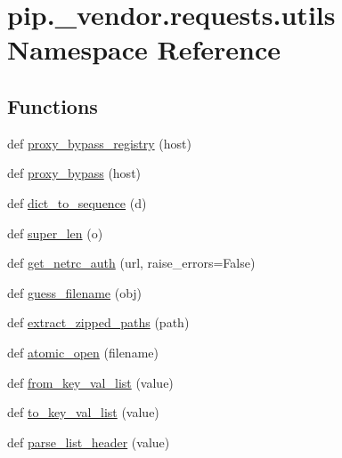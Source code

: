 \hypertarget{namespacepip_1_1__vendor_1_1requests_1_1utils}{}\section{pip.\+\_\+vendor.\+requests.\+utils Namespace Reference}
\label{namespacepip_1_1__vendor_1_1requests_1_1utils}
\subsection*{Functions}
\begin{DoxyCompactItemize}
\item 
def \hyperlink{namespacepip_1_1__vendor_1_1requests_1_1utils_ae01a288e9e64d3a6341b9b07cc06d3ee}{proxy\+\_\+bypass\+\_\+registry} (host)
\item 
def \hyperlink{namespacepip_1_1__vendor_1_1requests_1_1utils_ae931cb674d7a3a3929f41f054ab25c8a}{proxy\+\_\+bypass} (host)
\item 
def \hyperlink{namespacepip_1_1__vendor_1_1requests_1_1utils_a2d8f91bc902147ff375a5e6be69a1d2b}{dict\+\_\+to\+\_\+sequence} (d)
\item 
def \hyperlink{namespacepip_1_1__vendor_1_1requests_1_1utils_a728d14d509de2836fe639503828c619e}{super\+\_\+len} (o)
\item 
def \hyperlink{namespacepip_1_1__vendor_1_1requests_1_1utils_a5d3ffafa29cafc9f1bd209036b9b8277}{get\+\_\+netrc\+\_\+auth} (url, raise\+\_\+errors=False)
\item 
def \hyperlink{namespacepip_1_1__vendor_1_1requests_1_1utils_a8e4518d98e2701a9f26eedca1aaff79e}{guess\+\_\+filename} (obj)
\item 
def \hyperlink{namespacepip_1_1__vendor_1_1requests_1_1utils_a3bc38a35bf1c124528a4abc53e34ca76}{extract\+\_\+zipped\+\_\+paths} (path)
\item 
def \hyperlink{namespacepip_1_1__vendor_1_1requests_1_1utils_a2c01c80f3c6e449ef7919e846f453f13}{atomic\+\_\+open} (filename)
\item 
def \hyperlink{namespacepip_1_1__vendor_1_1requests_1_1utils_a13a0ff7bcf06bfa0926a87ddd9e6547c}{from\+\_\+key\+\_\+val\+\_\+list} (value)
\item 
def \hyperlink{namespacepip_1_1__vendor_1_1requests_1_1utils_a387fb02387fa79d4087ff5396ee653cb}{to\+\_\+key\+\_\+val\+\_\+list} (value)
\item 
def \hyperlink{namespacepip_1_1__vendor_1_1requests_1_1utils_a05632265e5bbb006cb9ab04b9d5984b1}{parse\+\_\+list\+\_\+header} (value)

\end{DoxyCompactItemize}

